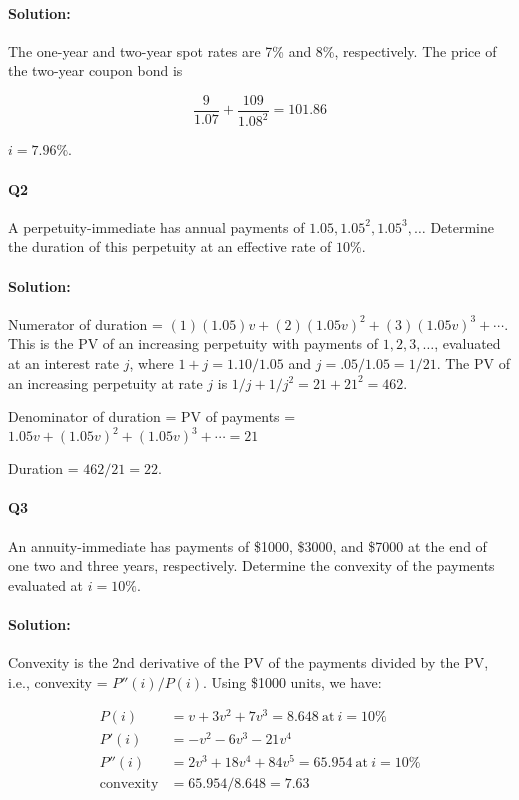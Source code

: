 \documentclass[a4paper, 11pt, twoside]{article}
\begin{document}
\paragraph{Solution:} The one-year and two-year spot rates are 7\% and 8\%, respectively. The price of the two-year coupon bond is

\[\frac{9}{1.07}+\frac{109}{1.08^2}=101.86\]

$i=7.96\%$.

\paragraph{Q2} A perpetuity-immediate has annual payments of $1.05, 1.05^2, 1.05^3,\dots$ Determine the duration of this perpetuity at an effective rate of $10\%$.

\paragraph{Solution:} Numerator of duration = $(1)(1.05)v+(2)(1.05v)^2+(3)(1.05v)^3+\cdots$. This is the PV of an increasing perpetuity with payments of $1,2,3, \dots$, evaluated at an interest rate $j$, where $1+j=1.10/1.05$ and $j=.05/1.05=1/21$. The PV of an increasing perpetuity at rate $j$ is $1/j+1/j^2=21+21^2=462$.

Denominator of duration = PV of payments = $1.05v+ (1.05v)^2+(1.05v)^3+\cdots = 21$

Duration = $462/21=22$.

\paragraph{Q3} An annuity-immediate has payments of \$1000, \$3000, and \$7000 at the end of one two and three years, respectively. Determine the convexity of the payments evaluated at $i=10\%$.

\paragraph{Solution:} Convexity is the 2nd derivative of the PV of the payments divided by the PV, i.e., convexity = $P''(i)/P(i)$. Using \$1000 units, we have:

\[\begin{split}
	P(i)&=v+3v^2+7v^3=8.648\ \text{at}\ i=10\%\\
	P'(i)&=-v^2-6v^3-21v^4\\
	P''(i)&=2v^3+18v^4+84v^5=65.954\ \text{at}\ i=10\%\\
	\text{convexity}&=65.954/8.648=7.63
\end{split}
\]
\end{document}
